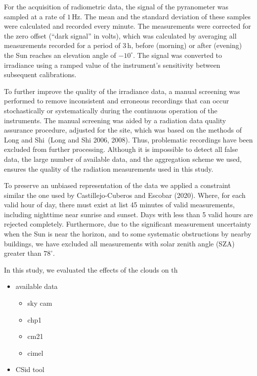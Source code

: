 \documentclass[
]{article}
\providecommand{\tightlist}{%
  \setlength{\itemsep}{0pt}\setlength{\parskip}{0pt}}
\begin{document}
For the acquisition of radiometric data, the signal of the pyranometer was sampled
at a rate of \(1\,\text{Hz}\).
The mean and the standard deviation of these samples were calculated and recorded
every minute.
The measurements were corrected for the zero offset (``dark signal'' in volts), which
was calculated by averaging all measurements recorded for a period of \(3\,\text{h}\),
before (morning) or after (evening) the Sun reaches an elevation angle of \(-10^\circ\).
The signal was converted to irradiance using a ramped value of the instrument's
sensitivity between subsequent calibrations.

To further improve the quality of the irradiance data, a manual screening was
performed to remove inconsistent and erroneous recordings that can occur
stochastically or systematically during the continuous operation of the instruments.
The manual screening was aided by a radiation data quality assurance procedure,
adjusted for the site, which was based on the methods of Long and Shi~(Long and Shi 2006, 2008).
Thus, problematic recordings have been excluded from further processing.
Although it is impossible to detect all false data, the large number of available
data, and the aggregation scheme we used, ensures the quality of the radiation
measurements used in this study.

To preserve an unbiased representation of the data we applied a constraint similar
the one used by Castillejo-Cuberos and Escobar (2020). Where, for each valid hour of day, there
must exist at list 45 minutes of valid measurements, including nighttime near
sunrise and sunset. Days with less than 5 valid hours are rejected completely.
Furthermore, due to the significant measurement uncertainty when the Sun is near the
horizon, and to some systematic obstructions by nearby buildings, we have excluded
all measurements with solar zenith angle (SZA) greater than \(78^\circ\).

In this study, we evaluated the effects of the clouds on th

\begin{itemize}
\tightlist
\item
  available data

  \begin{itemize}
  \tightlist
  \item
    sky cam
  \item
    chp1
  \item
    cm21
  \item
    cimel
  \end{itemize}
\item
  CSid tool
\end{itemize}
\end{document}
